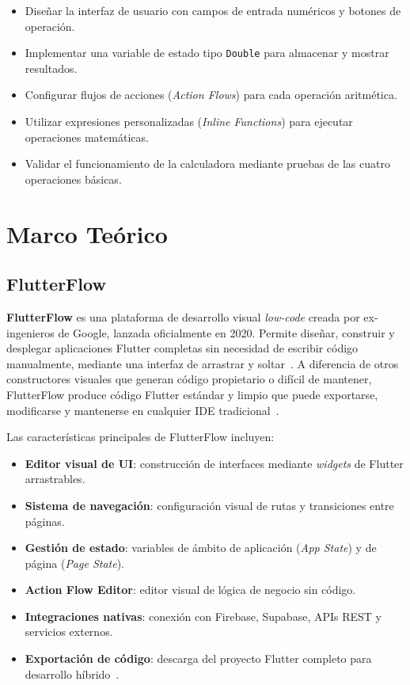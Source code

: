\documentclass[12pt,a4paper]{article}
\begin{document}
\begin{itemize}
  \item Diseñar la interfaz de usuario con campos de entrada numéricos y botones de operación.
  \item Implementar una variable de estado tipo \texttt{Double} para almacenar y mostrar resultados.
  \item Configurar flujos de acciones (\textit{Action Flows}) para cada operación aritmética.
  \item Utilizar expresiones personalizadas (\textit{Inline Functions}) para ejecutar operaciones matemáticas.
  \item Validar el funcionamiento de la calculadora mediante pruebas de las cuatro operaciones básicas.
\end{itemize}

\section{Marco Teórico}

\subsection{FlutterFlow}

\textbf{FlutterFlow} es una plataforma de desarrollo visual \textit{low-code} creada por ex-ingenieros de Google, lanzada oficialmente en 2020. Permite diseñar, construir y desplegar aplicaciones Flutter completas sin necesidad de escribir código manualmente, mediante una interfaz de arrastrar y soltar~\cite{flutterflow2024}. A diferencia de otros constructores visuales que generan código propietario o difícil de mantener, FlutterFlow produce código Flutter estándar y limpio que puede exportarse, modificarse y mantenerse en cualquier IDE tradicional~\cite{lowcode2023}.

Las características principales de FlutterFlow incluyen:

\begin{itemize}
  \item \textbf{Editor visual de UI}: construcción de interfaces mediante \textit{widgets} de Flutter arrastrables.
  \item \textbf{Sistema de navegación}: configuración visual de rutas y transiciones entre páginas.
  \item \textbf{Gestión de estado}: variables de ámbito de aplicación (\textit{App State}) y de página (\textit{Page State}).
  \item \textbf{Action Flow Editor}: editor visual de lógica de negocio sin código.
  \item \textbf{Integraciones nativas}: conexión con Firebase, Supabase, APIs REST y servicios externos.
  \item \textbf{Exportación de código}: descarga del proyecto Flutter completo para desarrollo híbrido~\cite{flutterflow2024}.
\end{itemize}
\end{document}

